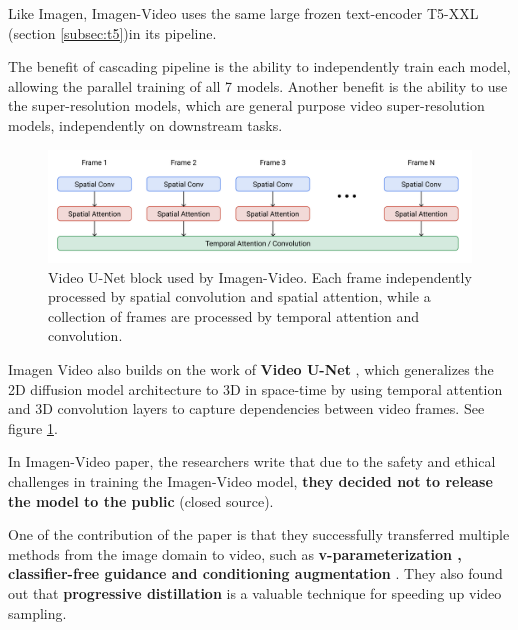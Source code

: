 Like Imagen, Imagen-Video uses the same large frozen text-encoder T5-XXL (section \ref{subsec:t5})in its pipeline.

The benefit of cascading pipeline is the ability to independently train each model, allowing the parallel training of all 7 models. Another benefit is the ability to use the super-resolution models, which are general purpose video super-resolution models, independently on downstream tasks.


\begin{figure}
    \centering
    \includegraphics[width=1\textwidth]{images/imagen_video/video_u_net.png}
    \caption{Video U-Net block \cite{video_diffusion_models} used by Imagen-Video. Each frame independently processed by spatial convolution and spatial attention, while a collection of frames are processed by temporal attention and convolution.}
    \label{fig:imagen_video_video_unet}
\end{figure}


Imagen Video also builds on the work of \textbf{Video U-Net} \cite{video_diffusion_models}, which generalizes the 2D diffusion model architecture to 3D in space-time by using temporal attention and 3D convolution layers to capture dependencies between video frames. See figure \ref{fig:imagen_video_video_unet}.

In Imagen-Video paper, the researchers write that due to the safety and ethical challenges in training the Imagen-Video model, \textbf{they decided not to release the model to the public} (closed source).

One of the contribution of the paper is that they successfully transferred multiple methods from the image domain to video, such as \textbf{v-parameterization \cite{v_prediction}, classifier-free guidance and conditioning augmentation} \cite{cascaded_diffusion_models}. They also found out that \textbf{progressive distillation} \cite{v_prediction} \cite{meng2023distillation} is a valuable technique for speeding up video sampling.














